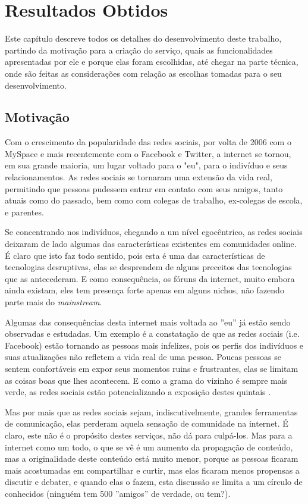 \documentclass[diss]{template/setrem}
\begin{document}
\chapter{Resultados Obtidos}
\label{chapter:resultadosobtidos}
Este capítulo descreve todos os detalhes do desenvolvimento deste trabalho, partindo da motivação para a criação do serviço, quais as funcionalidades apresentadas por ele e porque elas foram escolhidas, até chegar na parte técnica, onde são feitas as considerações com relação as escolhas tomadas para o seu desenvolvimento.

\section{Motivação}
Com o crescimento da popularidade das redes sociais, por volta de 2006 com o MySpace e mais recentemente com o Facebook e Twitter, a internet se tornou, em sua grande maioria, um lugar voltado para o "eu", para o indivíduo e seus relacionamentos. As redes sociais se tornaram uma extensão da vida real, permitindo que pessoas pudessem entrar em contato com seus amigos, tanto atuais como do passado, bem como com colegas de trabalho, ex-colegas de escola, e parentes.

Se concentrando nos indivíduos, chegando a um nível egocêntrico, as redes sociais deixaram de lado algumas das características existentes em comunidades online. É claro que isto faz todo sentido, pois esta é uma das características de tecnologias desruptivas, elas se desprendem de alguns preceitos das tecnologias que as antecederam. E como consequência, os fóruns da internet, muito embora ainda existam, eles tem presença forte apenas em alguns nichos, não fazendo parte mais do \emph{mainstream}.

Algumas das consequências desta internet mais voltada ao ''eu'' já estão sendo observadas e estudadas. Um exemplo é a constatação de que as redes sociais (i.e. Facebook) estão tornando as pessoas mais infelizes, pois os perfis dos indivíduos e suas atualizações não refletem a vida real de uma pessoa. Poucas pessoas se sentem confortáveis em expor seus momentos ruins e frustrantes, elas se limitam as coisas boas que lhes acontecem. E como a grama do vizinho é sempre mais verde, as redes sociais estão potencializando a exposição destes quintais \citep{Copeland2012}.

Mas por mais que as redes sociais sejam, indiscutivelmente, grandes ferramentas de comunicação, elas perderam aquela sensação de comunidade na internet. É claro, este não é o propósito destes serviços, não dá para culpá-los. Mas para a internet como um todo, o que se vê é um aumento da propagação de conteúdo, mas a originalidade deste conteúdo está muito menor, porque as pessoas ficaram mais acostumadas em compartilhar e curtir, mas elas ficaram menos propensas a discutir e debater, e quando elas o fazem, esta discussão se limita a um círculo de conhecidos (ninguém tem 500 ''amigos'' de verdade, ou tem?).
\end{document}

